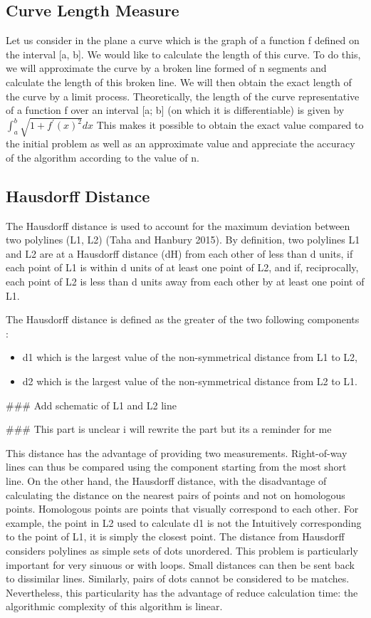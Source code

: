 \documentclass{article}
\begin{document}
\subsection{Curve Length Measure}

Let us consider in the plane a curve which is the graph of a function f defined on the interval [a, b]. We would like to calculate the length of this curve. To do this, we will approximate the curve by a broken line formed of n segments and calculate the length of this broken line. We will then obtain the exact length of the curve by a limit process.
Theoretically, the length of the curve representative of a
function f over an interval [a; b] (on which it is differentiable) is given by $\int_{a}^{b} \sqrt{1+f^{\prime}(x)^{2}} d x$
This makes it possible to obtain the exact value compared to the initial problem
as well as an approximate value and appreciate the accuracy of the algorithm
according to the value of n.

\subsection{Hausdorff Distance }
The Hausdorff distance is used to account for the maximum deviation between two polylines (L1, L2) (Taha and Hanbury 2015). By definition, two polylines L1 and L2 are at a Hausdorff distance (dH) from each other of less than d units, if each point of L1 is within d units of at least one point of L2, and if, reciprocally, each point of L2 is less than d units away from each other by at least one
point of L1.

The Hausdorff distance is defined as the greater of the two following components :

\begin{itemize}
    \item d1 which is the largest value of the non-symmetrical distance from L1 to L2,
    \item d2 which is the largest value of the non-symmetrical distance from L2 to L1.
\end{itemize}

\#\#\# Add schematic of L1 and L2 line


\#\#\# This part is unclear i will rewrite the part but its a reminder for me


This distance has the advantage of providing two measurements. Right-of-way lines can thus be compared using the component starting from the most short line. On the other hand, the Hausdorff distance, with the disadvantage of calculating the
distance on the nearest pairs of points and not on homologous points. Homologous points are points that visually correspond to each other. For example, the point in L2 used to calculate d1 is not the Intuitively corresponding to the point of L1, it is simply the closest point. The distance from Hausdorff considers polylines as simple sets of dots unordered. This problem is particularly important for very sinuous or with loops. Small distances can then be sent back to dissimilar lines. Similarly, pairs of dots cannot be considered to be matches. Nevertheless, this particularity has the advantage of
reduce calculation time: the algorithmic complexity of this algorithm is linear. 
\end{document}
